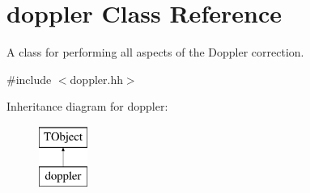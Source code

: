 \hypertarget{classdoppler}{}\section{doppler Class Reference}
\label{classdoppler}


A class for performing all aspects of the Doppler correction.  




{\ttfamily \#include $<$doppler.\+hh$>$}

Inheritance diagram for doppler\+:\begin{figure}[H]
\begin{center}
\leavevmode
\includegraphics[height=2.000000cm]{classdoppler}
\end{center}
\end{figure}

